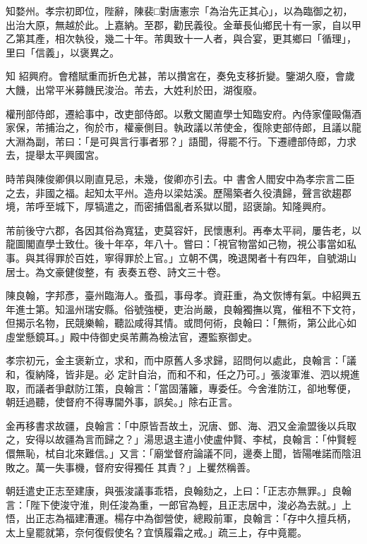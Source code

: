 \begin{pinyinscope}
 知婺州。孝宗初即位，陛辭，陳裴□對唐憲宗「為治先正其心」，以為臨御之初，出治大原，無越於此。上嘉納。至郡，勸民義役。金華長仙鄉民十有一家，自以甲乙第其產，相次執役，幾二十年。芾輿致十一人者，與合宴，更其鄉曰「循理」，里曰「信義」，以褒異之。



 知
 紹興府。會稽賦重而折色尤甚，芾以攢宮在，奏免支移折變。鑒湖久廢，會歲大饑，出常平米募饑民浚治。芾去，大姓利於田，湖復廢。



 權刑部侍郎，遷給事中，改吏部侍郎。以敷文閣直學士知臨安府。內侍家僮毆傷酒家保，芾捕治之，徇於市，權豪側目。執政議以芾使金，復除吏部侍郎，且議以龍大淵為副，芾曰：「是可與言行事者邪？」語聞，得罷不行。下遷禮部侍郎，力求去，提舉太平興國宮。



 時芾與陳俊卿俱以剛直見忌，未幾，俊卿亦引去。中
 書舍人閻安中為孝宗言二臣之去，非國之福。起知太平州。造舟以梁姑溪。歷陽築者久役潰歸，聲言欲趨郡境，芾呼至城下，厚犒遣之，而密捕倡亂者系獄以聞，詔褒諭。知隆興府。



 芾前後守六郡，各因其俗為寬猛，吏莫容奸，民懷惠利。再奉太平祠，屢告老，以龍圖閣直學士致仕。後十年卒，年八十。嘗曰：「視官物當如己物，視公事當如私事。與其得罪於百姓，寧得罪於上官。」立朝不偶，晚退閑者十有四年，自號湖山居士。為文豪健俊整，有
 表奏五卷、詩文三十卷。



 陳良翰，字邦彥，臺州臨海人。蚤孤，事母孝。資莊重，為文恢博有氣。中紹興五年進士第。知溫州瑞安縣。俗號強梗，吏治尚嚴，良翰獨撫以寬，催租不下文符，但揭示名物，民競樂輸，聽訟咸得其情。或問何術，良翰曰：「無術，第公此心如虛堂懸鏡耳。」殿中侍御史吳芾薦為檢法官，遷監察御史。



 孝宗初元，金主褒新立，求和，而中原舊人多求歸，詔問何以處此，良翰言：「議和，復納降，皆非是。必
 定計自治，而和不和，任之乃可。」張浚軍淮、泗以規進取，而議者爭獻防江策，良翰言：「當固藩籬，專委任。今舍淮防江，卻地奪便，朝廷過聽，使督府不得專閫外事，誤矣。」除右正言。



 金再移書求故疆，良翰言：「中原皆吾故土，況唐、鄧、海、泗又金渝盟後以兵取之，安得以故疆為言而歸之？」湯思退主遣小使盧仲賢、李栻，良翰言：「仲賢輕儇無恥，栻自北來難信。」又言：「廟堂督府論議不同，邊奏上聞，皆陽唯諾而陰沮敗之。萬一失事機，督府安得獨任
 其責？」上矍然稱善。



 朝廷遣史正志至建康，與張浚議事乖牾，良翰劾之，上曰：「正志亦無罪。」良翰言：「陛下使浚守淮，則任浚為重，一郎官為輕，且正志居中，浚必為去就。」上悟，出正志為福建漕運。楊存中為御營使，總殿前軍，良翰言：「存中久擅兵柄，太上皇罷就第，奈何復假使名？宜慎履霜之戒。」疏三上，存中竟罷。




\end{pinyinscope}
